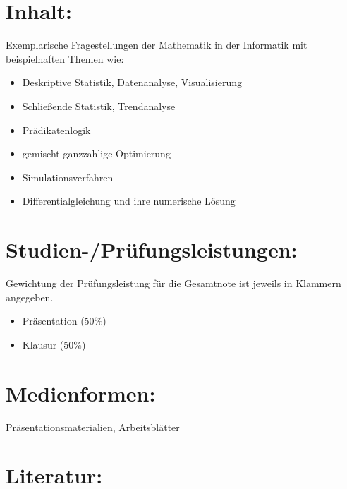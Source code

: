 \section*{Inhalt:\label{/mi-2017/modulbeschreibungen-master/MA_All_Modul_Mathematik}}\label{inhaltpathlabelmi-2017modulbeschreibungen-mastermaux5fallux5fmodulux5fmathematik}

Exemplarische Fragestellungen der Mathematik in der Informatik mit
beispielhaften Themen wie:

\begin{itemize}
\tightlist
\item
  Deskriptive Statistik, Datenanalyse, Visualisierung
\item
  Schließende Statistik, Trendanalyse
\item
  Prädikatenlogik
\item
  gemischt-ganzzahlige Optimierung
\item
  Simulationsverfahren
\item
  Differentialgleichung und ihre numerische Lösung
\end{itemize}

\section*{Studien-/Prüfungsleistungen:\label{/mi-2017/modulbeschreibungen-master/MA_All_Modul_Mathematik}}\label{studien-pruxfcfungsleistungenpathlabelmi-2017modulbeschreibungen-mastermaux5fallux5fmodulux5fmathematik}

Gewichtung der Prüfungsleistung für die Gesamtnote ist jeweils in
Klammern angegeben.

\begin{itemize}
\tightlist
\item
  Präsentation (50\%)
\item
  Klausur (50\%)
\end{itemize}

\section*{Medienformen:\label{/mi-2017/modulbeschreibungen-master/MA_All_Modul_Mathematik}}\label{medienformenpathlabelmi-2017modulbeschreibungen-mastermaux5fallux5fmodulux5fmathematik}

Präsentationsmaterialien, Arbeitsblätter

\section*{Literatur:\label{/mi-2017/modulbeschreibungen-master/MA_All_Modul_Mathematik}}\label{literaturpathlabelmi-2017modulbeschreibungen-mastermaux5fallux5fmodulux5fmathematik}

